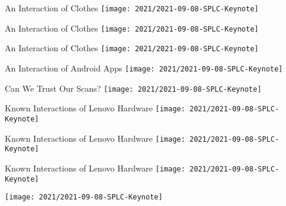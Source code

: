 \documentclass[
	aspectratio=169, %
	8pt, %
	handout, %
]{beamer}
\begin{document}
\begin{frame}{An Interaction of Clothes}
	\centering\texttt{[image: 2021/2021-09-08-SPLC-Keynote]}
\end{frame}
\begin{frame}{An Interaction of Clothes}
	\centering\texttt{[image: 2021/2021-09-08-SPLC-Keynote]}
\end{frame}
\begin{frame}{An Interaction of Clothes}
	\centering\texttt{[image: 2021/2021-09-08-SPLC-Keynote]}
\end{frame}

\begin{frame}{An Interaction of Android Apps}
	\centering\texttt{[image: 2021/2021-09-08-SPLC-Keynote]}
\end{frame}

\begin{frame}{Can We Trust Our Scans?}
	\centering\texttt{[image: 2021/2021-09-08-SPLC-Keynote]}
\end{frame}

\begin{frame}{Known Interactions of Lenovo Hardware}
	\centering\texttt{[image: 2021/2021-09-08-SPLC-Keynote]}
\end{frame}
\begin{frame}{Known Interactions of Lenovo Hardware}
	\centering\texttt{[image: 2021/2021-09-08-SPLC-Keynote]}
\end{frame}
\begin{frame}{Known Interactions of Lenovo Hardware}
	\centering\texttt{[image: 2021/2021-09-08-SPLC-Keynote]}
\end{frame}
\begin{frame}
	\centering\texttt{[image: 2021/2021-09-08-SPLC-Keynote]}
\end{frame}
\end{document}
